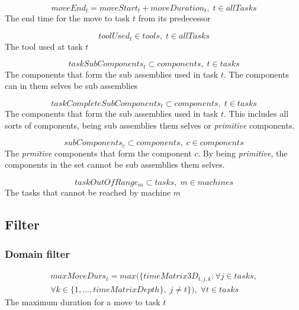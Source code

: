 \documentclass[10pt,a4paper]{report}
\begin{document}
\begin{equation}\label{eq:51}
moveEnd_t = moveStart_t + moveDuration_t, \; t \in allTasks\end{equation}
The end time for the move to task $t$ from its predecessor

\begin{equation}\label{eq:52}
toolUsed_t \in tools, \; t \in allTasks\end{equation}
The tool used at task $t$

\begin{equation}\label{eq:53}
taskSubComponents_t \subset components, \; t \in tasks\end{equation}
The components that form the sub assemblies used in task $t$. The components can in them selves be sub assemblies

\begin{equation}\label{eq:54}
taskCompleteSubComponents_t \subset components, \; t \in tasks\end{equation}
The components that form the sub assemblies used in task $t$. This includes all sorts of components, being sub assemblies them selves or \emph{primitive} components.

\begin{equation}\label{eq:55}
subComponents_c \subset components, \; c \in components\end{equation}
The \emph{prmitive} components that form the component $c$. By being \emph{primitive}, the components in the set cannot be sub assemblies them selves.

\begin{equation}\label{eq:56}
taskOutOfRange_m \subset tasks, \; m \in machines\end{equation}
The tasks that cannot be reached by machine $m$


\subsection*{Filter}
\subsubsection*{Domain filter}


\begin{equation}
\begin{aligned}\label{eq:57}
maxMoveDurs_t = max(\{timeMatrix3D_{t,j,k} : \forall j \in tasks, \\
\forall k \in \{1 , \ldots , timeMatrixDepth\}, \; j \neq t\}), \; \forall t \in tasks
\end{aligned}
\end{equation}
The maximum duration for a move to task $t$
\end{document}
